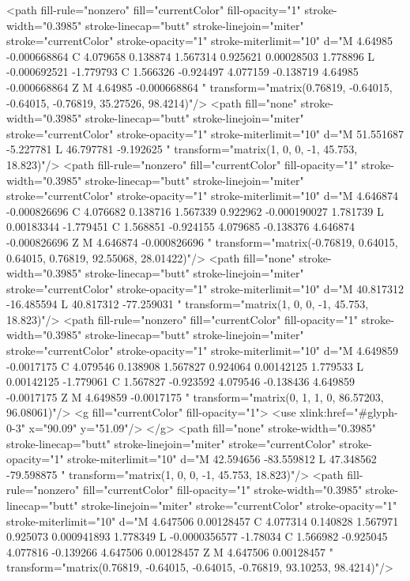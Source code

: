 <path fill-rule="nonzero" fill="currentColor" fill-opacity="1" stroke-width="0.3985" stroke-linecap="butt" stroke-linejoin="miter" stroke="currentColor" stroke-opacity="1" stroke-miterlimit="10" d="M 4.64985 -0.000668864 C 4.079658 0.138874 1.567314 0.925621 0.00028503 1.778896 L -0.000692521 -1.779793 C 1.566326 -0.924497 4.077159 -0.138719 4.64985 -0.000668864 Z M 4.64985 -0.000668864 " transform="matrix(0.76819, -0.64015, -0.64015, -0.76819, 35.27526, 98.4214)"/>
<path fill="none" stroke-width="0.3985" stroke-linecap="butt" stroke-linejoin="miter" stroke="currentColor" stroke-opacity="1" stroke-miterlimit="10" d="M 51.551687 -5.227781 L 46.797781 -9.192625 " transform="matrix(1, 0, 0, -1, 45.753, 18.823)"/>
<path fill-rule="nonzero" fill="currentColor" fill-opacity="1" stroke-width="0.3985" stroke-linecap="butt" stroke-linejoin="miter" stroke="currentColor" stroke-opacity="1" stroke-miterlimit="10" d="M 4.646874 -0.000826696 C 4.076682 0.138716 1.567339 0.922962 -0.000190027 1.781739 L 0.00183344 -1.779451 C 1.568851 -0.924155 4.079685 -0.138376 4.646874 -0.000826696 Z M 4.646874 -0.000826696 " transform="matrix(-0.76819, 0.64015, 0.64015, 0.76819, 92.55068, 28.01422)"/>
<path fill="none" stroke-width="0.3985" stroke-linecap="butt" stroke-linejoin="miter" stroke="currentColor" stroke-opacity="1" stroke-miterlimit="10" d="M 40.817312 -16.485594 L 40.817312 -77.259031 " transform="matrix(1, 0, 0, -1, 45.753, 18.823)"/>
<path fill-rule="nonzero" fill="currentColor" fill-opacity="1" stroke-width="0.3985" stroke-linecap="butt" stroke-linejoin="miter" stroke="currentColor" stroke-opacity="1" stroke-miterlimit="10" d="M 4.649859 -0.0017175 C 4.079546 0.138908 1.567827 0.924064 0.00142125 1.779533 L 0.00142125 -1.779061 C 1.567827 -0.923592 4.079546 -0.138436 4.649859 -0.0017175 Z M 4.649859 -0.0017175 " transform="matrix(0, 1, 1, 0, 86.57203, 96.08061)"/>
<g fill="currentColor" fill-opacity="1">
<use xlink:href="#glyph-0-3" x="90.09" y="51.09"/>
</g>
<path fill="none" stroke-width="0.3985" stroke-linecap="butt" stroke-linejoin="miter" stroke="currentColor" stroke-opacity="1" stroke-miterlimit="10" d="M 42.594656 -83.559812 L 47.348562 -79.598875 " transform="matrix(1, 0, 0, -1, 45.753, 18.823)"/>
<path fill-rule="nonzero" fill="currentColor" fill-opacity="1" stroke-width="0.3985" stroke-linecap="butt" stroke-linejoin="miter" stroke="currentColor" stroke-opacity="1" stroke-miterlimit="10" d="M 4.647506 0.00128457 C 4.077314 0.140828 1.567971 0.925073 0.000941893 1.778349 L -0.0000356577 -1.78034 C 1.566982 -0.925045 4.077816 -0.139266 4.647506 0.00128457 Z M 4.647506 0.00128457 " transform="matrix(0.76819, -0.64015, -0.64015, -0.76819, 93.10253, 98.4214)"/>
